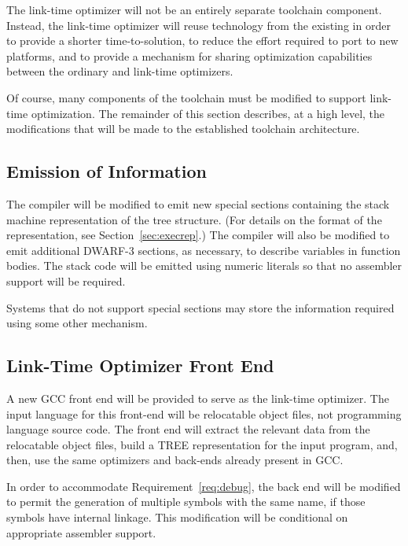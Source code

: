The link-time optimizer will not be an entirely separate toolchain
component.  Instead, the link-time optimizer will reuse technology
from the existing in order to provide a shorter time-to-solution, to
reduce the effort required to port to new platforms, and to provide a
mechanism for sharing optimization capabilities between the ordinary
and link-time optimizers.

Of course, many components of the toolchain must be modified to
support link-time optimization.  The remainder of this section
describes, at a high level, the modifications that will be made to the
established toolchain architecture.

\subsection{Emission of Information}

The compiler will be modified to emit new special sections containing
the stack machine representation of the tree structure.  (For details
on the format of the representation, see Section~\ref{sec:execrep}.)
The compiler will also be modified to emit additional DWARF-3
sections, as necessary, to describe variables in function bodies.  The
stack code will be emitted using numeric literals so that no assembler
support will be required.

\begin{note}
 Systems that do not support special sections may store the
 information required using some other mechanism.
\end{note}

\subsection{Link-Time Optimizer Front End}

A new GCC front end will be provided to serve as the link-time
optimizer. The input language for this front-end will be relocatable
object files, not programming language source code.  The front end
will extract the relevant data from the relocatable object files,
build a TREE representation for the input program, and, then, use the
same optimizers and back-ends already present in GCC.

In order to accommodate Requirement~\ref{req:debug}, the back end will
be modified to permit the generation of multiple symbols with the same
name, if those symbols have internal linkage.  This modification will
be conditional on appropriate assembler support.

